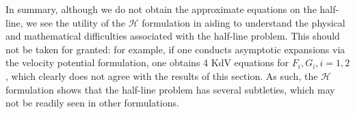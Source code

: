\documentclass[11pt,reqno,oneside,a4paper]{article}
\begin{document}
In summary, although we do not obtain the approximate equations on the half-line, we see the utility of the $\mathcal{H}$ formulation in aiding to understand the physical and mathematical difficulties associated with the half-line problem. This should not be taken for granted: for example, if one conducts asymptotic expansions via the velocity potential formulation, one obtains 4 KdV equations for $F_i, G_i, i =1, 2$, which clearly does not agree with the results of this section. As such, the $\mathcal{H}$ formulation shows that the half-line problem has several subtleties, which may not be readily seen in other formulations. 


{\small}
\end{document}
